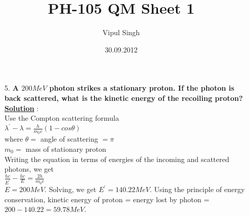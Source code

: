 \documentclass[10pt, a4paper]{article}
\begin{document}
\title{PH-105 QM Sheet 1}
\date{30.09.2012}
\author{Vipul Singh}
\maketitle
\begin{enumerate}
\item[5.]{\bf A $200MeV$ photon strikes a stationary proton. If the photon is back scattered, what is the kinetic energy of the recoiling proton?}\\

{\underline {\bf Solution}} : \\
Use the Compton scattering formula \\
$\lambda^{'}-\lambda=\frac{h}{m_{0}c}(1-cos\theta)$\\
where $\theta=$ angle of scattering $=\pi$\\
$m_{0}=$ mass of stationary proton\\
Writing the equation in terms of energies of the incoming and scattered photons, we get\\
$\frac{hc}{E^{'}}-\frac{hc}{E}=\frac{2h}{m_{0}c}$\\
$E=200MeV$. Solving, we get $E^{'}=140.22MeV$. Using the principle of energy conservation, kinetic energy of proton = energy lost by photon = $200-140.22 = 59.78MeV$.
\end{enumerate}
\end{document}
